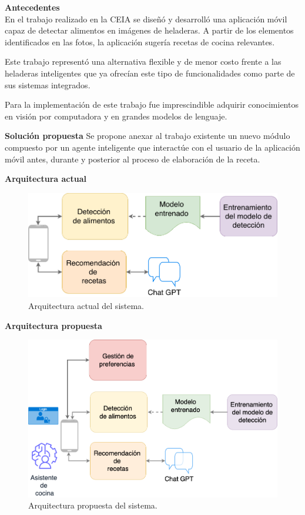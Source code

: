 \documentclass[
11pt, %
]{charter}
\begin{document}
\textbf{Antecedentes} \\
En el trabajo realizado en la CEIA se diseñó y desarrolló una aplicación móvil capaz de detectar alimentos en imágenes de heladeras. A partir de los elementos identificados en las fotos, la aplicación sugería recetas de cocina relevantes.

Este trabajo representó una alternativa flexible y de menor costo frente a las heladeras inteligentes que ya ofrecían este tipo de funcionalidades como parte de sus sistemas integrados.

Para la implementación de este trabajo fue imprescindible adquirir conocimientos en visión por computadora y en grandes modelos de lenguaje.

\newpage
\textbf{Solución propuesta}
Se propone anexar al trabajo existente un nuevo módulo compuesto por un agente inteligente que interactúe con el usuario de la aplicación móvil antes, durante y posterior al proceso de elaboración de la receta.

\textbf{Arquitectura actual}

 \begin{figure}[H]
 \centering 
\includegraphics[width=.8\textwidth]{./Figuras/DiagramaGeneralActual.png}
 \caption{Arquitectura actual del sistema.}
 \label{fig:arquitectura-actual}
 \end{figure}

\textbf{Arquitectura propuesta}

\begin{figure}[H]
\centering 
\includegraphics[width=.8\textwidth]{./Figuras/DiagramaGeneral.png}
\caption{Arquitectura propuesta del sistema.}
\label{fig:arquitectura-propuesta}
\end{figure}
\end{document}
